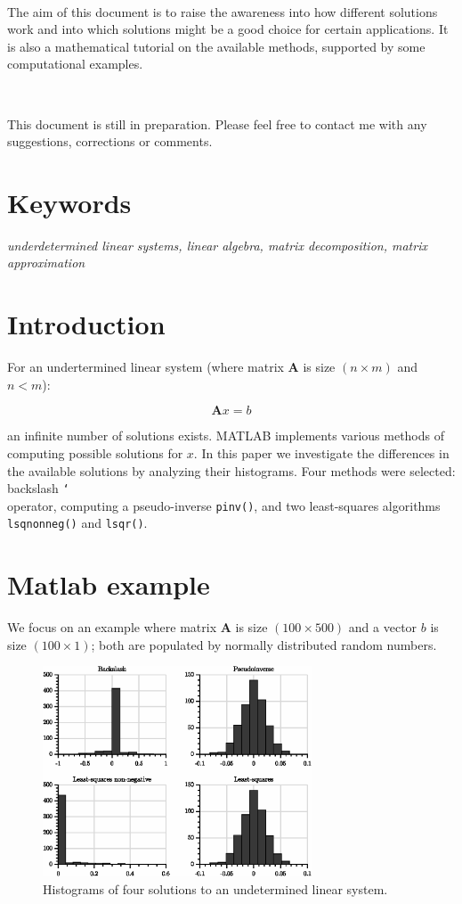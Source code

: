 \documentclass[10pt,twocolumn]{article}
\begin{document}
\,\,

The aim of this document is to raise the awareness into how different solutions work and into which solutions might be a good choice for certain applications. It is also a mathematical tutorial on the available methods, supported by some computational examples.

\,\,

This document is still in preparation. Please feel free to contact me with any suggestions, corrections or comments.

\section*{Keywords}

\textit{underdetermined linear systems, linear algebra, matrix decomposition, matrix approximation}

\tableofcontents

\section{Introduction}

For an undertermined linear system (where matrix $\bm{A}$ is size $(n \times m)$ and $n<m$):

\begin{equation}
\bm{A} x = b
\end{equation}


an infinite number of solutions exists. MATLAB implements various methods of computing possible solutions for $x$. In this paper we investigate the differences in the available solutions by analyzing their histograms. Four methods were selected: backslash \texttt{\char`\\} operator, computing a pseudo-inverse \texttt{pinv()}, and two least-squares algorithms \texttt{lsqnonneg()} and \texttt{lsqr()}.

\section{Matlab example}

We focus on an example where matrix $\bm{A}$ is size $(100 \times 500)$ and a vector $b$ is size $(100 \times 1)$; both are populated by normally distributed random numbers.

\begin{figure}[H]
\centering\includegraphics[width=8cm]{DWGs/histograms.eps}
\caption{Histograms of four solutions to an undetermined linear system.}			
\label{fig:histograms}
\end{figure}
\end{document}
